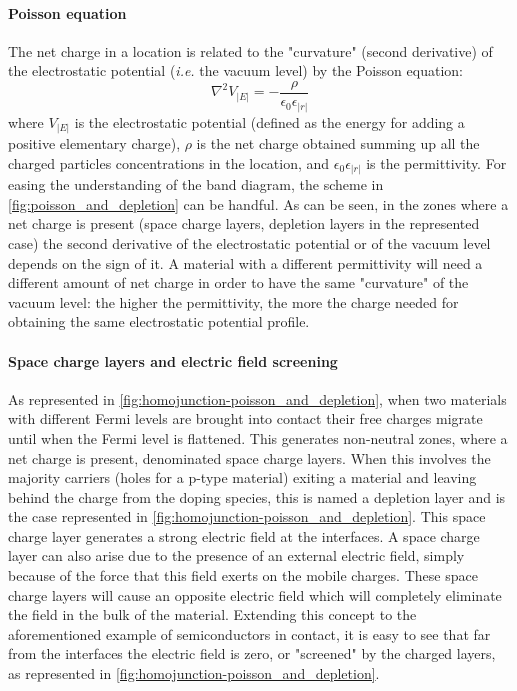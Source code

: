 		\paragraph{Poisson equation}
		The net charge in a location is related to the "curvature" (second derivative) of the electrostatic potential (\textsl{i.e.} the vacuum level) by the Poisson equation:
		\begin{equation}
			\nabla^2 V_|E| = -\frac{\rho}{\epsilon_0 \epsilon_|r|}
		\end{equation}
		where $V_|E|$ is the electrostatic potential (defined as the energy for adding a positive elementary charge), $\rho$ is the net charge obtained summing up all the charged particles concentrations in the location, and $\epsilon_0 \epsilon_|r|$ is the permittivity.
		For easing the understanding of the band diagram, the scheme in \cref{fig:poisson_and_depletion} can be handful.
		As can be seen, in the zones where a net charge is present (space charge layers, depletion layers in the represented case) the second derivative of the electrostatic potential or of the vacuum level depends on the sign of it.
		A material with a different permittivity will need a different amount of net charge in order to have the same "curvature" of the vacuum level: the higher the permittivity, the more the charge needed for obtaining the same electrostatic potential profile.
	
		\paragraph{Space charge layers and electric field screening}\label{intro-space_charge}
		As represented in \cref{fig:homojunction-poisson_and_depletion}, when two materials with different Fermi levels are brought into contact their free charges migrate until when the Fermi level is flattened.
		This generates non-neutral zones, where a net charge is present, denominated space charge layers.
		When this involves the majority carriers (holes for a p-type material) exiting a material and leaving behind the charge from the doping species, this is named a depletion layer and is the case represented in \cref{fig:homojunction-poisson_and_depletion}.
		This space charge layer generates a strong electric field at the interfaces.
		A space charge layer can also arise due to the presence of an external electric field, simply because of the force that this field exerts on the mobile charges.
		These space charge layers will cause an opposite electric field which will completely eliminate the field in the bulk of the material.
		Extending this concept to the aforementioned example of semiconductors in contact, it is easy to see that far from the interfaces the electric field is zero, or "screened" by the charged layers, as represented in \cref{fig:homojunction-poisson_and_depletion}.
		
